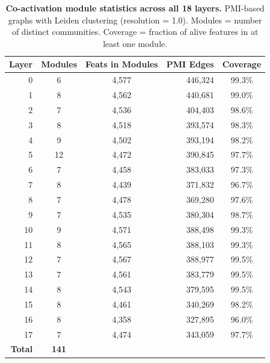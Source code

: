 \documentclass[onecolumn]{article}
\begin{document}
\begin{table}[H]
\centering
\caption{\textbf{Co-activation module statistics across all 18 layers.} PMI-based graphs with Leiden clustering (resolution = 1.0). Modules = number of distinct communities. Coverage = fraction of alive features in at least one module.}
\label{tab:modules_full}
\smallskip
\begin{tabular}{rccrc}
\toprule
Layer & Modules & Feats in Modules & PMI Edges & Coverage \\
\midrule
0  & 6  & 4,577 & 446,324 & 99.3\% \\
1  & 8  & 4,562 & 440,681 & 99.0\% \\
2  & 7  & 4,536 & 404,403 & 98.6\% \\
3  & 8  & 4,518 & 393,574 & 98.3\% \\
4  & 9  & 4,502 & 393,194 & 98.2\% \\
5  & 12 & 4,472 & 390,845 & 97.7\% \\
6  & 7  & 4,458 & 383,033 & 97.3\% \\
7  & 8  & 4,439 & 371,832 & 96.7\% \\
8  & 7  & 4,478 & 369,280 & 97.6\% \\
9  & 7  & 4,535 & 380,304 & 98.7\% \\
10 & 9  & 4,571 & 388,498 & 99.3\% \\
11 & 8  & 4,565 & 388,103 & 99.3\% \\
12 & 7  & 4,567 & 388,977 & 99.5\% \\
13 & 7  & 4,561 & 383,779 & 99.5\% \\
14 & 8  & 4,543 & 379,595 & 99.5\% \\
15 & 8  & 4,461 & 340,269 & 98.2\% \\
16 & 8  & 4,358 & 327,895 & 96.0\% \\
17 & 7  & 4,474 & 343,059 & 97.7\% \\
\midrule
\textbf{Total} & \textbf{141} & & & \\
\bottomrule
\end{tabular}
\end{table}
\end{document}
